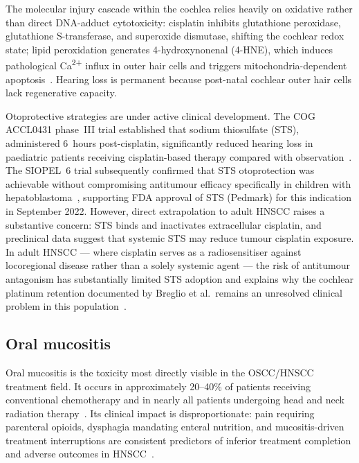 \documentclass[preprint,review,12pt]{elsarticle}
\begin{document}
The molecular injury cascade within the cochlea relies heavily on oxidative
rather than direct DNA-adduct cytotoxicity: cisplatin inhibits glutathione
peroxidase, glutathione S-transferase, and superoxide dismutase, shifting the
cochlear redox state; lipid peroxidation generates 4-hydroxynonenal (4-HNE),
which induces pathological Ca\textsuperscript{2+} influx in outer hair cells
and triggers mitochondria-dependent apoptosis~\cite{Karasawa2015}. Hearing loss
is permanent because post-natal cochlear outer hair cells lack regenerative
capacity.

Otoprotective strategies are under active clinical development.
The COG ACCL0431 phase~III trial established that sodium thiosulfate (STS),
administered 6~hours post-cisplatin, significantly reduced hearing loss in
paediatric patients receiving cisplatin-based therapy compared with
observation~\cite{Freyer2017}. The SIOPEL~6 trial subsequently confirmed
that STS otoprotection was achievable without compromising antitumour
efficacy specifically in children with hepatoblastoma~\cite{Brock2018},
supporting FDA approval of STS (Pedmark) for this indication in September
2022.  However, direct extrapolation to adult HNSCC raises a substantive
concern: STS binds and inactivates extracellular cisplatin, and preclinical
data suggest that systemic STS may reduce tumour cisplatin exposure.  In
adult HNSCC --- where cisplatin serves as a radiosensitiser against
locoregional disease rather than a solely systemic agent --- the risk of
antitumour antagonism has substantially limited STS adoption and explains
why the cochlear platinum retention documented by Breglio et al.\ remains
an unresolved clinical problem in this population~\cite{Breglio2017}.

\subsection{Oral mucositis}

Oral mucositis is the toxicity most directly visible in the OSCC/HNSCC
treatment field. It occurs in approximately 20--40\% of patients receiving
conventional chemotherapy and in nearly all patients undergoing head and neck
radiation therapy~\cite{Lalla2014}. Its clinical impact is disproportionate:
pain requiring parenteral opioids, dysphagia mandating enteral nutrition, and
mucositis-driven treatment interruptions are consistent predictors of inferior
treatment completion and adverse outcomes in HNSCC~\cite{Sonis2004, Lalla2014}.
\end{document}
